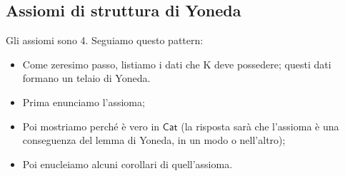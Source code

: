 \documentclass[11pt]{article}
\def\Cat{\mathsf{Cat}}
\theoremstyle{reference}
\begin{document}
\subsection{Assiomi di struttura di Yoneda}
\label{sec:org67c473d}

Gli assiomi sono 4. Seguiamo questo pattern:

\begin{itemize}
\item Come zeresimo passo, listiamo i dati che K deve possedere;
questi dati formano un telaio di Yoneda.
\item Prima enunciamo l’assioma;
\item Poi mostriamo perché è vero in \(\Cat\) (la risposta sarà
che l’assioma è una conseguenza del lemma di Yoneda, in un
modo o nell’altro);
\item Poi enucleiamo alcuni corollari di quell’assioma.
\end{itemize}
\end{document}
